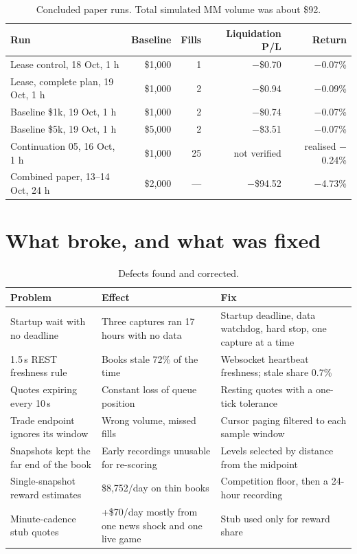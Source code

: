 \documentclass[11pt,a4paper]{article}
\begin{document}
\begin{table}[H]\centering\small
\begin{tabular}{@{}lrrrr@{}}
\toprule
Run & Baseline & Fills & Liquidation P/L & Return \\
\midrule
Lease control, 18 Oct, 1 h & \$1,000 & 1 & $-$\$0.70 & $-$0.07\% \\
Lease, complete plan, 19 Oct, 1 h & \$1,000 & 2 & $-$\$0.94 & $-$0.09\% \\
Baseline \$1k, 19 Oct, 1 h & \$1,000 & 2 & $-$\$0.74 & $-$0.07\% \\
Baseline \$5k, 19 Oct, 1 h & \$5,000 & 2 & $-$\$3.51 & $-$0.07\% \\
Continuation 05, 16 Oct, 1 h & \$1,000 & 25 & not verified & realised $-$0.24\% \\
Combined paper, 13--14 Oct, 24 h & \$2,000 & --- & $-$\$94.52 & $-$4.73\% \\
\bottomrule
\end{tabular}
\caption{Concluded paper runs. Total simulated MM volume was about \$92.}
\end{table}

\section{What broke, and what was fixed}
\begin{table}[H]\centering\small
\begin{tabularx}{\linewidth}{@{}p{3.6cm}YY@{}}
\toprule
Problem & Effect & Fix \\
\midrule
Startup wait with no deadline & Three captures ran 17 hours with no data & Startup deadline, data watchdog, hard stop, one capture at a time \\
1.5\,s REST freshness rule & Books stale 72\% of the time & Websocket heartbeat freshness; stale share 0.7\% \\
Quotes expiring every 10\,s & Constant loss of queue position & Resting quotes with a one-tick tolerance \\
Trade endpoint ignores its window & Wrong volume, missed fills & Cursor paging filtered to each sample window \\
Snapshots kept the far end of the book & Early recordings unusable for re-scoring & Levels selected by distance from the midpoint \\
Single-snapshot reward estimates & \$8,752/day on thin books & Competition floor, then a 24-hour recording \\
Minute-cadence stub quotes & +\$70/day mostly from one news shock and one live game & Stub used only for reward share \\
\bottomrule
\end{tabularx}
\caption{Defects found and corrected.}
\end{table}
\end{document}
